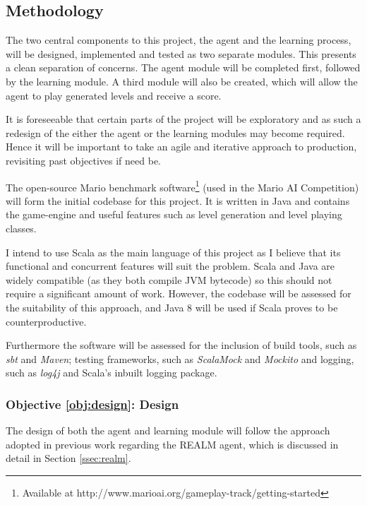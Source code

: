 \subsection{Methodology}

The two central components to this project, the agent and the learning process, will be designed, implemented and tested as two separate modules. This presents a clean separation of concerns. The agent module will be completed first, followed by the learning module. A third module will also be created, which will allow the agent to play generated levels and receive a score.

It is foreseeable that certain parts of the project will be exploratory and as such a redesign of the either the agent or the learning modules may become required. Hence it will be important to take an agile and iterative approach to production, revisiting past objectives if need be.

The open-source Mario benchmark software\footnote{Available at http://www.marioai.org/gameplay-track/getting-started} (used in the Mario AI Competition) will form the initial codebase for this project. It is written in Java and contains the game-engine and useful features such as level generation and level playing classes.

I intend to use Scala as the main language of this project as I believe that its functional and concurrent features will suit the problem. Scala and Java are widely compatible (as they both compile JVM bytecode) so this should not require a significant amount of work. However, the codebase will be assessed for the suitability of this approach, and Java 8 will be used if Scala proves to be counterproductive.

Furthermore the software will be assessed for the inclusion of build tools, such as \emph{sbt} and \emph{Maven}; testing frameworks, such as \emph{ScalaMock} and \emph{Mockito} and logging, such as \emph{log4j} and Scala's inbuilt logging package.

\subsubsection*{Objective \ref{obj:design}: Design}
\label{meth:design}

The design of both the agent and learning module will follow the approach adopted in previous work regarding the REALM agent, which is discussed in detail in Section \ref{ssec:realm}.


